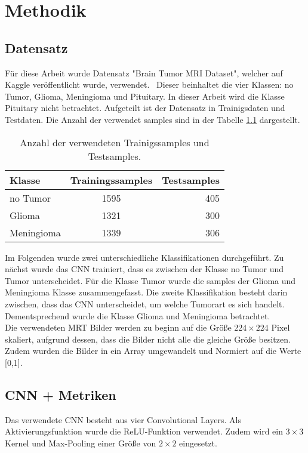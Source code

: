 \chapter{Methodik}

\section{Datensatz}
Für diese Arbeit wurde Datensatz "Brain Tumor MRI Dataset", welcher auf Kaggle veröffentlicht wurde, verwendet.~\cite{msoud_nickparvar_2021}
Dieser beinhaltet die vier Klassen: no Tumor, Glioma, Meningioma und Pituitary.
In dieser Arbeit wird die Klasse Pituitary nicht betrachtet.
Aufgeteilt ist der Datensatz in Trainigsdaten und Testdaten.
Die Anzahl der verwendet samples sind in der Tabelle \ref{tab:daten} dargestellt. 
\begin{table}[H]
    \centering
    \begin{tabular}{l c r}
        \hline
        Klasse      & Trainingssamples & Testsamples \\
        \hline
        no Tumor    &    1595              & 405 \\
        Glioma      &    1321              & 300 \\
        Meningioma  &    1339              & 306 \\
        \hline
  \end{tabular}
  \caption{Anzahl der verwendeten Trainigssamples und Testsamples.}
  \label{tab:daten}
\end{table}
Im Folgenden wurde zwei unterschiedliche Klassifikationen durchgeführt.
Zu nächst wurde das CNN trainiert, dass es zwischen der Klasse no Tumor und Tumor unterscheidet. Für die Klasse Tumor
wurde die samples der Glioma und Meningioma Klasse zusammengefasst.
Die zweite Klassifikation besteht darin zwischen, dass das CNN unterscheidet, um welche Tumorart es sich handelt.
Dementsprechend wurde die Klasse Glioma und Meningioma betrachtet.\\

Die verwendeten MRT Bilder werden zu beginn auf die Größe $224 \times 224$ Pixel skaliert, aufgrund dessen, dass die Bilder nicht alle die 
gleiche Größe besitzen.
Zudem wurden die Bilder in ein Array umgewandelt und Normiert auf die Werte [0,1].

\section{CNN + Metriken}
Das verwendete CNN besteht aus vier Convolutional Layers. Als Aktivierungsfunktion wurde die ReLU-Funktion verwendet.
Zudem wird ein $3 \times 3$ Kernel und Max-Pooling einer Größe von $2 \times 2$ eingesetzt. 

